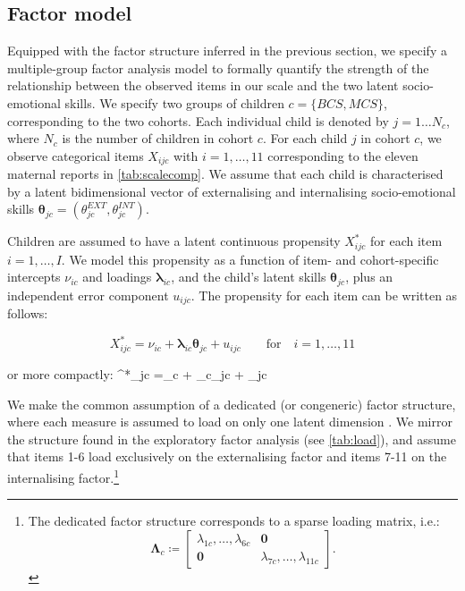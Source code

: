 \subsection{Factor model \label{sec:fm}}

Equipped with the factor structure inferred in the previous section, we specify a multiple-group factor analysis model to formally quantify the strength of the relationship between the observed items in our scale and the two latent socio-emotional skills. We specify two groups of children $c=\{BCS,MCS\}$, corresponding to the two cohorts. Each individual child is denoted by $j=1\dots N_c$, where $N_c$ is the number of children in cohort $c$. For each child $j$ in cohort $c$, we observe categorical items $X_{ijc}$ with $i=1,\dots,11$ corresponding to the eleven maternal reports in \autoref{tab:scalecomp}. We assume that each child is characterised by a latent bidimensional vector of externalising and internalising socio-emotional skills $\bm{\theta}_{jc} = (\theta_{jc}^{EXT},\theta_{jc}^{INT})$.

Children are assumed to have a latent continuous propensity $X^*_{ijc}$ for each item $i=1,\dots,I$. We model this propensity as a function of item- and cohort-specific intercepts $\nu_{ic}$ and loadings $\bm{\lambda}_{ic}$, and the child's latent skills $\bm{\theta}_{jc}$, plus an independent error component $u_{ijc}$. The propensity for each item can be written as follows:

$$X^*_{ijc} =\nu_{ic} + \bm{\lambda}_{ic}\bm{\theta}_{jc} + u_{ijc} \qquad \text{for} \quad i = 1,\dots,11$$

or more compactly:
\be\label{eq:propens}
^*_{jc} =\bm{\nu}_c + \bm{\Lambda}_{c}\bm{\theta}_{jc} + _{jc}
\ee

We make the common assumption of a dedicated (or congeneric) factor structure, where each measure is assumed to load on only one latent dimension \citep{Heckman2013,Conti2010a,Attanasio2018a}. We mirror the structure found in the exploratory factor analysis (see \autoref{tab:load}), and assume that items 1-6 load exclusively on the externalising factor and items 7-11 on the internalising factor.\footnote{The dedicated factor structure corresponds to a sparse loading matrix, i.e.: $$\bm{\Lambda}_{c} \coloneqq \begin{bmatrix} \lambda_{1c}, \dots, \lambda_{6c} & \bm{0} \\ \bm{0} & \lambda_{7c}, \dots, \lambda_{11c} \end{bmatrix}.$$}


